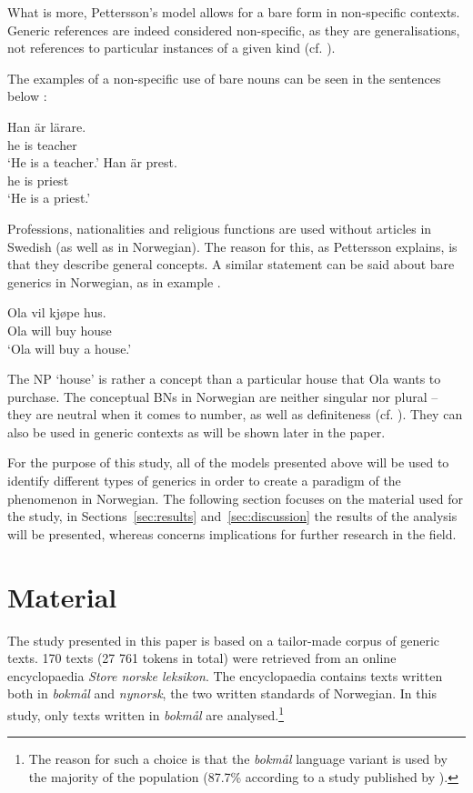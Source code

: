 \documentclass[output=paper]{langsci/langscibook}
\begin{document}
What is more, Pettersson's model allows for a bare form in non-specific contexts. Generic references are indeed considered non-specific, as they are generalisations, not references to particular instances of a given kind (cf. \citealp{Lyons1977}).

The examples of a non-specific use of bare nouns can be seen in the sentences below \citep[127]{Pettersson1976}:

\ea\label{ex:swedish6}
	\gll Han är lärare. \\
		 he is teacher \\
	\glt `He is a teacher.'
\ex\label{ex:swedish7}
	\gll Han är prest. \\
		 he is priest \\
	\glt `He is a priest.'
\z

\noindent Professions, nationalities and religious functions are used without articles in Swedish (as well as in Norwegian). The reason for this, as Pettersson explains, is that they describe general concepts. A similar statement can be said about bare generics in Norwegian, as in example .

\ea\label{ex:norwegian1}
	\gll Ola vil kjøpe hus. \\
		 Ola will buy house \\
	\glt `Ola will buy a house.'
\z

\noindent The NP `house' is rather a concept than a particular house that Ola wants to purchase. The conceptual BNs in Norwegian are neither singular nor plural -- they are neutral when it comes to number, as well as definiteness (cf. \citealp{Halmoy2016}). They can also be used in generic contexts as will be shown later in the paper.

For the purpose of this study, all of the models presented above will be used to identify different types of generics in order to create a paradigm of the phenomenon in Norwegian. The following section focuses on the material used for the study, in Sections~\ref{sec:results} and~\ref{sec:discussion} the results of the analysis will be presented, whereas  concerns implications for further research in the field.

\section{Material}
\label{sec:material}
The study presented in this paper is based on a tailor-made corpus of generic texts. 170 texts (27 761 tokens in total) were retrieved from an online encyclopaedia \textit{Store norske leksikon}. The encyclopaedia contains texts written both in \textit{bokmål} and \textit{nynorsk}, the two written standards of Norwegian. In this study, only texts written in \textit{bokmål} are analysed.\footnote{The reason for such a choice is that the \textit{bokmål} language variant is used by the majority of the population (87.7\% according to a study published by \citealt{Riksmalsforbundet2017}).}
\end{document}
